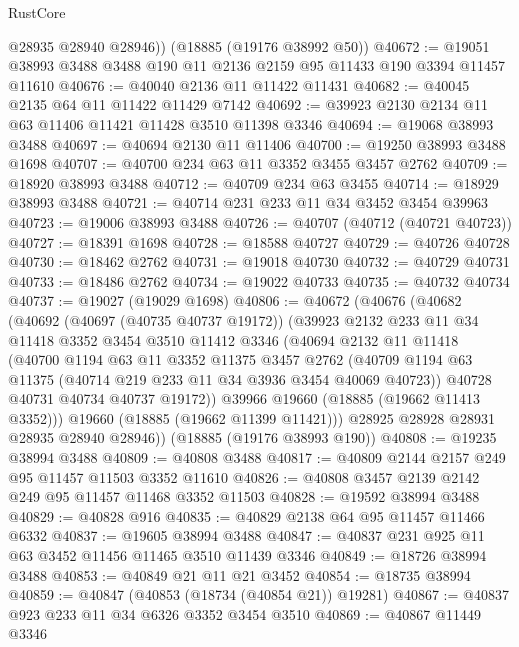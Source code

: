 \begin{lexlean}{RustCore}
\begin{coremodule}
        @28935
        @28940
        @28946))
    (@18885 (@19176 @38992 @50))
@40672 := @19051 @38993 @3488 @3488 @190 @11 @2136 @2159 @95 @11433 @190 @3394 @11457 @11610
@40676 := @40040 @2136 @11 @11422 @11431
@40682 := @40045 @2135 @64 @11 @11422 @11429 @7142
@40692 := @39923 @2130 @2134 @11 @63 @11406 @11421 @11428 @3510 @11398 @3346
@40694 := @19068 @38993 @3488
@40697 := @40694 @2130 @11 @11406
@40700 := @19250 @38993 @3488 @1698
@40707 := @40700 @234 @63 @11 @3352 @3455 @3457 @2762
@40709 := @18920 @38993 @3488
@40712 := @40709 @234 @63 @3455
@40714 := @18929 @38993 @3488
@40721 := @40714 @231 @233 @11 @34 @3452 @3454 @39963
@40723 := @19006 @38993 @3488
@40726 := @40707 (@40712 (@40721 @40723))
@40727 := @18391 @1698
@40728 := @18588 @40727
@40729 := @40726 @40728
@40730 := @18462 @2762
@40731 := @19018 @40730
@40732 := @40729 @40731
@40733 := @18486 @2762
@40734 := @19022 @40733
@40735 := @40732 @40734
@40737 := @19027 (@19029 @1698)
@40806 := @40672
    (@40676
      (@40682
        (@40692
          (@40697 (@40735 @40737 @19172))
          (@39923
            @2132
            @233
            @11
            @34
            @11418
            @3352
            @3454
            @3510
            @11412
            @3346
            (@40694
              @2132
              @11
              @11418
              (@40700
                @1194
                @63
                @11
                @3352
                @11375
                @3457
                @2762
                (@40709 @1194 @63 @11375 (@40714 @219 @233 @11 @34 @3936 @3454 @40069 @40723))
                @40728
                @40731
                @40734
                @40737
                @19172))
            @39966
            @19660
            (@18885 (@19662 @11413 @3352)))
          @19660
          (@18885 (@19662 @11399 @11421)))
        @28925
        @28928
        @28931
        @28935
        @28940
        @28946))
    (@18885 (@19176 @38993 @190))
@40808 := @19235 @38994 @3488
@40809 := @40808 @3488
@40817 := @40809 @2144 @2157 @249 @95 @11457 @11503 @3352 @11610
@40826 := @40808 @3457 @2139 @2142 @249 @95 @11457 @11468 @3352 @11503
@40828 := @19592 @38994 @3488
@40829 := @40828 @916
@40835 := @40829 @2138 @64 @95 @11457 @11466 @6332
@40837 := @19605 @38994 @3488
@40847 := @40837 @231 @925 @11 @63 @3452 @11456 @11465 @3510 @11439 @3346
@40849 := @18726 @38994 @3488
@40853 := @40849 @21 @11 @21 @3452
@40854 := @18735 @38994
@40859 := @40847 (@40853 (@18734 (@40854 @21)) @19281)
@40867 := @40837 @923 @233 @11 @34 @6326 @3352 @3454 @3510
@40869 := @40867 @11449 @3346

\end{coremodule}
\end{lexlean}
